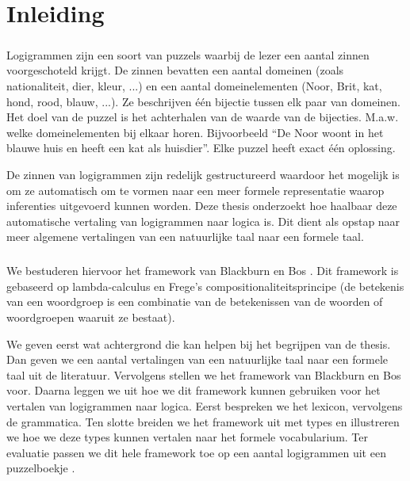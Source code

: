 \chapter{Inleiding}
\paragraph{} Logigrammen zijn een soort van puzzels waarbij de lezer een aantal zinnen voorgeschoteld krijgt. De zinnen bevatten een aantal domeinen (zoals nationaliteit, dier, kleur, ...) en een aantal domeinelementen (Noor, Brit, kat, hond, rood, blauw, ...). Ze beschrijven één bijectie tussen elk paar van domeinen. Het doel van de puzzel is het achterhalen van de waarde van de bijecties. M.a.w. welke domeinelementen bij elkaar horen. Bijvoorbeeld ``De Noor woont in het blauwe huis en heeft een kat als huisdier''. Elke puzzel heeft exact één oplossing.

De zinnen van logigrammen zijn redelijk gestructureerd waardoor het mogelijk is om ze automatisch om te vormen naar een meer formele representatie waarop inferenties uitgevoerd kunnen worden. Deze thesis onderzoekt hoe haalbaar deze automatische vertaling van logigrammen naar logica is. Dit dient als opstap naar meer algemene vertalingen van een natuurlijke taal naar een formele taal.

\paragraph{} We bestuderen hiervoor het framework van Blackburn en Bos \cite{Blackburn2005, Blackburn2006}. Dit framework is gebaseerd op lambda-calculus en Frege's compositionaliteitsprincipe (de betekenis van een woordgroep is een combinatie van de betekenissen van de woorden of woordgroepen waaruit ze bestaat).

We geven eerst wat achtergrond die kan helpen bij het begrijpen van de thesis. Dan geven we een aantal vertalingen van een natuurlijke taal naar een formele taal uit de literatuur. Vervolgens stellen we het framework van Blackburn en Bos voor. Daarna leggen we uit hoe we dit framework kunnen gebruiken voor het vertalen van logigrammen naar logica. Eerst bespreken we het lexicon, vervolgens de grammatica. Ten slotte breiden we het framework uit met types en illustreren we hoe we deze types kunnen vertalen naar het formele vocabularium. Ter evaluatie passen we dit hele framework toe op een aantal logigrammen uit een puzzelboekje \cite{logigrammen}.
